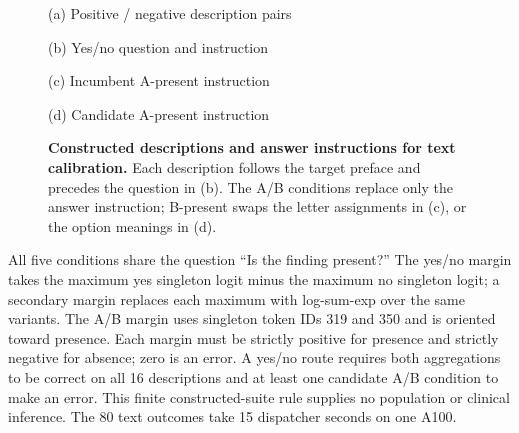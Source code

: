 \begin{figure}[H]
\centering
{}\par
{\small (a) Positive / negative description pairs}\par\medskip
{}\par
{\small (b) Yes/no question and instruction}\par\medskip
{}\par
{\small (c) Incumbent A-present instruction}\par\medskip
{}\par
{\small (d) Candidate A-present instruction}
\caption{\textbf{Constructed descriptions and answer instructions for text calibration.}
Each description follows the target preface and precedes the question in
(b). The A/B conditions replace only the answer instruction; B-present
swaps the letter assignments in (c), or the option meanings in (d).}
\label{fig:text-calibration-prompts}
\end{figure}

All five conditions share the question ``Is the finding present?'' The
yes/no margin takes the maximum yes singleton logit minus the maximum no
singleton logit; a secondary margin replaces each maximum with
log-sum-exp over the same variants. The A/B margin uses singleton token
IDs 319 and 350 and is oriented toward presence. Each margin must be
strictly positive for presence and strictly negative for absence; zero is
an error. A yes/no route requires both aggregations to be correct on all
16 descriptions and at least one candidate A/B condition to make an error.
This finite constructed-suite rule supplies no population or clinical
inference. The 80 text outcomes take 15 dispatcher seconds on one A100.

